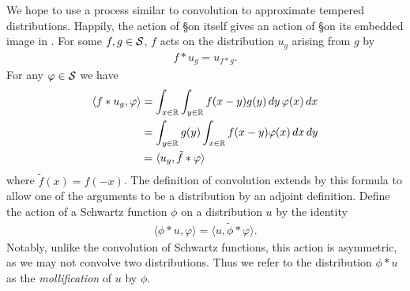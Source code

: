     We hope to use a process similar to convolution to approximate tempered distributions.
    Happily, the action of \S on itself gives an action of \S on its embedded image in \SS.
    For some $f,g\in\S$, $f$ acts on the distribution $u_g$ arising from $g$ by
    \begin{align*}
      f*u_g = u_{f*g} \text{.}
    \end{align*}
    For any $\varphi\in\S$ we have
    \begin{align*}
      \langle f*u_g, \varphi\rangle
      &= \int_{x\in\R} \int_{y\in\R} f(x-y)g(y)\,dy\,\varphi(x)\,dx
      \\&= \int_{y\in\R} g(y) \int_{x\in\R} f(x-y)\varphi(x)\,dx\,dy
      \\&= \langle u_g, \tilde f*\varphi\rangle
    \end{align*}
    where $\tilde f(x) = f(-x)$.
    The definition of convolution extends by this formula to allow one of the arguments to be a distribution by an adjoint definition.
    Define the action of a Schwartz function $\phi$ on a distribution $u$ by the identity
    \begin{align*}
      \langle \phi*u, \varphi\rangle
      = \langle u, \tilde\phi*\varphi\rangle \text{.}
    \end{align*}
    Notably, unlike the convolution of Schwartz functions, this action is asymmetric, as we may not convolve two distributions.
    Thus we refer to the distribution $\phi*u$ as the \emph{mollification} of $u$ by $\phi$.

